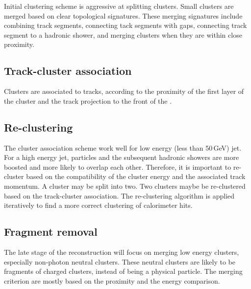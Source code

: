 Initial clustering scheme is aggressive at splitting clusters. Small clusters are merged  based on clear topological signatures. These merging signatures include combining track segments, connecting tack segments with gaps, connecting track segment to a hadronic shower, and merging clusters when they are within close proximity.

\subsection{Track-cluster association}

Clusters are associated to tracks, according to the proximity of the first layer of the cluster and the track projection to the front of the \ECAL.


\subsection{Re-clustering}

The cluster association scheme work well for low energy (less than 50\,GeV) jet. For a high energy jet, particles and the subsequent hadronic showers are more boosted and more likely to overlap each other. Therefore, it is important to re-cluster based on the compatibility of the cluster energy and the associated track momentum. A cluster may be split into two. Two clusters maybe be re-clustered based on the track-cluster association. The re-clustering algorithm is applied iteratively to find a more correct clustering of calorimeter hits.

\subsection{Fragment removal}
\label{sec:pandoraFragmentRemoval}
The late stage of the reconstruction will focus on merging low energy clusters, especially non-photon neutral clusters. These neutral clusters are likely to be fragments of charged clusters, instead of being a physical particle. The merging criterion are mostly based on the proximity and the energy comparison.

